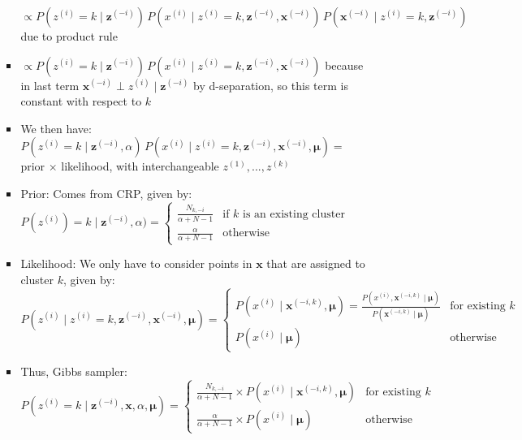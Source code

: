 \begin{itemize}
\begin{itemize}
\begin{itemize}
            $
            \propto P(z^{(i)} = k \mid \boldsymbol{z}^{(-i)}) \, P(x^{(i)} \mid z^{(i)} = k, \boldsymbol{z}^{(-i)}, \boldsymbol{x}^{(-i)}) \, P(\boldsymbol{x}^{(-i)} \mid z^{(i)} = k, \boldsymbol{z}^{(-i)})
            $ due to product rule
            \item 
            $
            \propto P(z^{(i)} = k \mid \boldsymbol{z}^{(-i)}) \, P(x^{(i)} \mid z^{(i)} = k, \boldsymbol{z}^{(-i)}, \boldsymbol{x}^{(-i)})
            $ because in last term $\boldsymbol{x}^{(-i)} \perp z^{(i)} \mid \boldsymbol{z}^{(-i)}$
            by d-separation, so this term is constant with respect to $k$ 
            \item We then have:
            $
            P(z^{(i)} = k \mid \boldsymbol{z}^{(-i)}, \alpha) \, P(x^{(i)} \mid z^{(i)} = k, \boldsymbol{z}^{(-i)}, \boldsymbol{x}^{(-i)}, \boldsymbol{\mu})
            =$ prior $\times$ likelihood, with interchangeable $z^{(1)},...,z^{(k)}$
            \item Prior: Comes from CRP, given by:
            $
            P(z^{(i)}) = k \mid \boldsymbol{z}^{(-i)}, \alpha) =
            \begin{cases}
                \frac{N_{k, -i}}{\alpha + N - 1} & \textrm{if $k$ is an existing cluster} \\
                \frac{\alpha}{\alpha + N - 1} & \textrm{otherwise}
            \end{cases}
            $
            \item Likelihood: We only have to consider points in $\boldsymbol{x}$ that are assigned to cluster $k$, given by:
            $
            P(z^{(i)} \mid z^{(i)} = k, \boldsymbol{z}^{(-i)}, \boldsymbol{x}^{(-i)}, \boldsymbol{\mu}) =
            \begin{cases}
                P(x^{(i)} \mid \boldsymbol{x}^{(-i,k)}, \boldsymbol{\mu}) =
                \frac{P(x^{(i)}, \boldsymbol{x}^{(-i,k)} \mid \boldsymbol{\mu})}{P(\boldsymbol{x}^{(-i,k)} \mid \boldsymbol{\mu})} & \textrm{for existing } k\\
                P(x^{(i)} \mid \boldsymbol{\mu}) & \textrm{otherwise}
            \end{cases}
            $
            \item Thus, Gibbs sampler: 
            $
            P(z^{(i)} = k \mid \boldsymbol{z}^{(-i)}, \boldsymbol{x}, \alpha, \boldsymbol{\mu}) =
            \begin{cases}
                \frac{N_{k, -i}}{\alpha + N - 1} \times P(x^{(i)} \mid \boldsymbol{x}^{(-i,k)}, \boldsymbol{\mu}) & \textrm{for existing } k\\
                \frac{\alpha}{\alpha + N - 1} \times P(x^{(i)} \mid \boldsymbol{\mu}) & \textrm{otherwise}
            \end{cases}
            $
        \end{itemize}
    \end{itemize}
\end{itemize}


